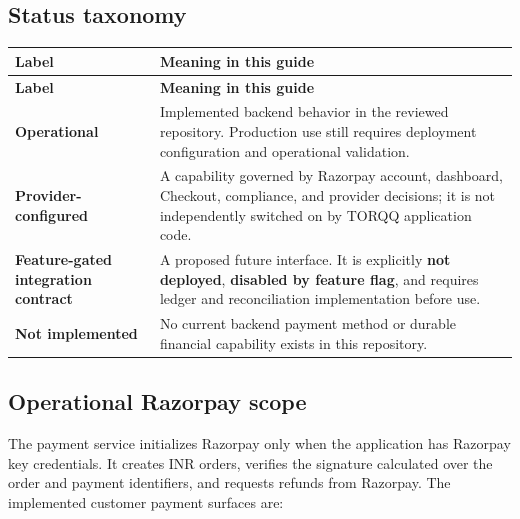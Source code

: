 \documentclass[11pt,a4paper]{article}
\newcommand{\status}[1]{\textbf{#1}}
\begin{document}
\subsection{Status taxonomy}
\begin{longtable}{Y Z}
\toprule
\textbf{Label} & \textbf{Meaning in this guide} \\
\midrule
\endfirsthead
\toprule
\textbf{Label} & \textbf{Meaning in this guide} \\
\midrule
\endhead
\status{Operational} & Implemented backend behavior in the reviewed repository. Production use still requires deployment configuration and operational validation. \\
\status{Provider-configured} & A capability governed by Razorpay account, dashboard, Checkout, compliance, and provider decisions; it is not independently switched on by TORQQ application code. \\
\status{Feature-gated integration contract} & A proposed future interface. It is explicitly \textbf{not deployed}, \textbf{disabled by feature flag}, and requires ledger and reconciliation implementation before use. \\
\status{Not implemented} & No current backend payment method or durable financial capability exists in this repository. \\
\bottomrule
\end{longtable}

\subsection{Operational Razorpay scope}
The payment service initializes Razorpay only when the application has Razorpay key credentials. It creates INR orders, verifies the signature calculated over the order and payment identifiers, and requests refunds from Razorpay. The implemented customer payment surfaces are:
\end{document}
